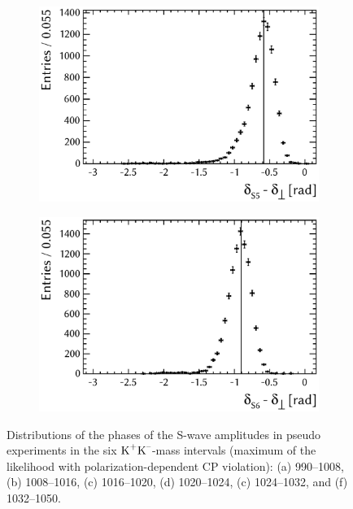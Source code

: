 \begin{figure}[tbp]
  \vspace*{0.02\textwidth}
  \begin{subfigure}{0.49\textwidth}
    \includegraphics[width=\textwidth]{graphics/results/parDist_polarDep_ASOddPhase_bin4}
    \caption{}
  \end{subfigure}
  \hfill%
  \begin{subfigure}{0.49\textwidth}
    \includegraphics[width=\textwidth]{graphics/results/parDist_polarDep_ASOddPhase_bin5}
    \caption{}
  \end{subfigure}

  \caption{Distributions of the phases of the S-wave amplitudes in pseudo experiments in the six $\text{K}^\text{+}\text{K}^\text{--}$-mass intervals
           (maximum of the likelihood with polarization-dependent CP violation):
           (a) 990--1008\unitsp\MeV, (b) 1008--1016\unitsp\MeV, (c) 1016--1020\unitsp\MeV,
           (d) 1020--1024\unitsp\MeV, (c) 1024--1032\unitsp\MeV, and (f) 1032--1050\unitsp\MeV.}
  \label{fig:parDists_SWavePhases}
\end{figure}

